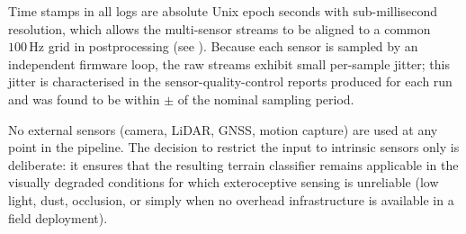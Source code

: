 Time stamps in all logs are absolute Unix epoch seconds with sub-millisecond
resolution, which allows the multi-sensor streams to be aligned to a common
$100\,\text{Hz}$ grid in postprocessing (see ).
Because each sensor is sampled by an independent firmware loop, the raw
streams exhibit small per-sample jitter; this jitter is characterised in
the sensor-quality-control reports produced for each run and was found to
be within $\pm$ of
the nominal sampling period.

No external sensors (camera, LiDAR, GNSS, motion capture) are used at any
point in the pipeline.
The decision to restrict the input to intrinsic sensors only is deliberate:
it ensures that the resulting terrain classifier remains applicable in the
visually degraded conditions for which exteroceptive sensing is unreliable
(low light, dust, occlusion, or simply when no overhead infrastructure is
available in a field deployment).










